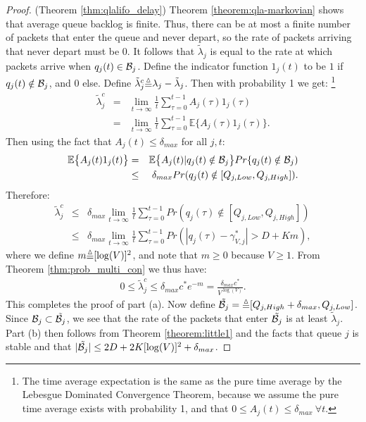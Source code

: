 \documentclass[journal]{IEEEtran}
\newcommand{\prob}{Pr}
\newcommand{\expect}[1]{\mathbb{E}\big\{#1\big\}}
\newcommand{\defequiv}{\mbox{\raisebox{-.3ex}{$\overset{\vartriangle}{=}$}}}
\newcommand{\script}[1]{{{\cal{#1} }}}
\begin{document}
\begin{proof} (Theorem \ref{thm:qlalifo_delay})   Theorem \ref{theorem:qla-markovian} shows that average queue backlog is finite.  Thus, there can be at most a finite
number of packets that enter the queue and never depart, so the rate of packets arriving that never depart must be $0$.  
It follows that $\tilde{\lambda}_j$ is equal to the rate at 
which packets arrive when $q_j(t) \in \script{B}_j$. 
Define the indicator function $1_j(t)$ to be $1$ if 
$q_j(t) \notin \script{B}_j$, and $0$ else.  Define $\tilde{\lambda}_j^c \defequiv \lambda_j - \tilde{\lambda}_j$. 
Then with probability 1 we get: \footnote{The 
time average expectation is the same as the pure time average by the Lebesgue Dominated Convergence
Theorem, because we assume the pure time average exists with
probability 1, and that $0 \leq A_j(t) \leq \delta_{max} \: \forall t$.} 
\begin{eqnarray*}
 \tilde{\lambda}_j^c &=& \lim_{t\rightarrow\infty} \frac{1}{t}\sum_{\tau=0}^{t-1} A_j(\tau)1_j(\tau) \\
 &=& \lim_{t\rightarrow\infty} \frac{1}{t}\sum_{\tau=0}^{t-1}\expect{A_j(\tau)1_j(\tau)}.  
\end{eqnarray*}
Then using the fact that $A_j(t)\leq\delta_{max}$ for all $j, t$: 
\begin{eqnarray*}
 \expect{A_j(t)1_j(t)} &=& \expect{A_j(t)|  q_j(t) \notin \script{B}_j}\prob\{q_j(t)\notin\script{B}_j) \\
 &\leq& \delta_{max} \prob(q_j(t)\notin[Q_{j,Low}, Q_{j,High}]). 
\end{eqnarray*}
Therefore: 
\begin{eqnarray*}
\tilde{\lambda}_j^c &\leq& \delta_{max}\lim_{t\rightarrow\infty} \frac{1}{t}\sum_{\tau=0}^{t-1}\prob(q_j(\tau) \notin [Q_{j,Low}, Q_{j,High}]) \\
&\leq& \delta_{max} \lim_{t\rightarrow\infty} \frac{1}{t}\sum_{\tau=0}^{t-1}\prob(|q_j(\tau) - \gamma_{V, j}^*| > D + Km), 
\end{eqnarray*}
where we define $m \defequiv [\log(V)]^2$, and note that $m\geq0$ because $V\geq1$. From Theorem \ref{thm:prob_multi_con} we thus have: 
\begin{eqnarray}
0 \leq \tilde{\lambda}_j^c \leq \delta_{max} c^* e^{-m}  = \frac{\delta_{max}c^*}{V^{\log(V)}}.
\end{eqnarray}
This completes the proof of part (a).  
Now define $\tilde{\script{B}_j}= \defequiv [Q_{j, High}+\delta_{max}, Q_{j, Low}]$. Since $\script{B}_j\subset\tilde{\script{B}_j}$, we see that the rate of the packets that enter $\tilde{\script{B}_j}$ is at least $\tilde{\lambda}_j$. 
Part (b) then follows from Theorem \ref{theorem:little1} and the facts that queue $j$ is stable and  that  $|\tilde{\script{B}_j}|\leq2D + 2K[\log(V)]^2+\delta_{max}$. 
\end{proof} 
\end{document}
